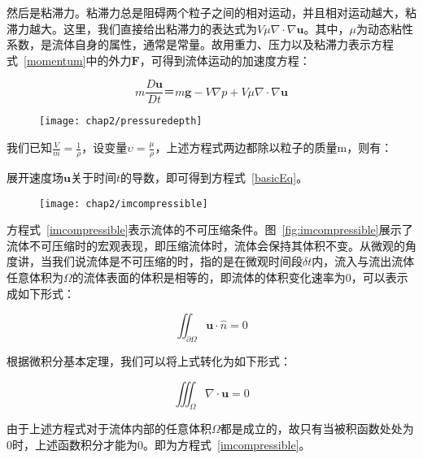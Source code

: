 然后是粘滞力。粘滞力总是阻碍两个粒子之间的相对运动，并且相对运动越大，粘滞力越大。这里，我们直接给出粘滞力的表达式为\(V\mu{\nabla \cdot \nabla {\boldsymbol u}}\)。其中，\(\mu\)为动态粘性系数，是流体自身的属性，通常是常量。故用重力、压力以及粘滞力表示方程式~\ref{momentum}中的外力\(\boldsymbol F\)，可得到流体运动的加速度方程：

\begin{equation}
 m\frac{D{\boldsymbol u}}{D{t}} ＝ m{\boldsymbol g} - V{\nabla p} + V{\mu}{\nabla \cdot \nabla {\boldsymbol u}}
\end{equation}

\begin{figure}
  \centering
   \texttt{[image: chap2/pressuredepth]}
\end{figure}

我们已知\(\frac{V}{m} = \frac{1}{\rho}\)，设变量\(\upsilon = \frac{\mu}{\rho}\)，上述方程式两边都除以粒子的质量m，则有：

展开速度场\(\boldsymbol u\)关于时间\(t\)的导数，即可得到方程式~\ref{basicEq}。

\begin{figure}
  \centering
   \texttt{[image: chap2/imcompressible]}
\end{figure}

方程式~\ref{imcompressible}表示流体的不可压缩条件。图~\ref{fig:imcompressible}展示了流体不可压缩时的宏观表现，即压缩流体时，流体会保持其体积不变。从微观的角度讲，当我们说流体是不可压缩的时，指的是在微观时间段\(\delta t\)内，流入与流出流体任意体积为\(\Omega\)的流体表面的体积是相等的，即流体的体积变化速率为0，可以表示成如下形式：

\begin{equation}
{\iint_{\partial \Omega}}{\boldsymbol u} \cdot {\hat n} = 0 
\end{equation}

根据微积分基本定理，我们可以将上式转化为如下形式：

\begin{equation}
{\iiint_{\Omega}} \nabla \cdot {\boldsymbol u} = 0 
\end{equation}

由于上述方程式对于流体内部的任意体积\(\Omega\)都是成立的，故只有当被积函数处处为0时，上述函数积分才能为0。即为方程式~\ref{imcompressible}。

